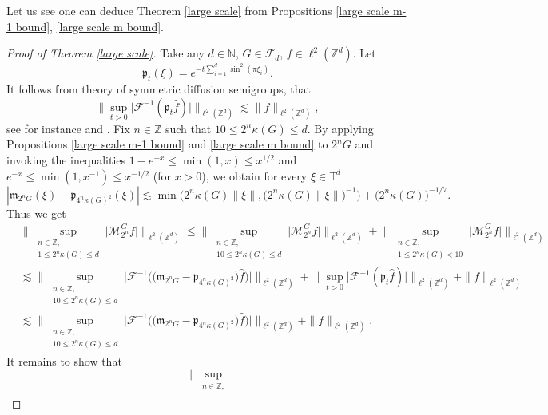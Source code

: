 \documentclass[a4paper,oneside, reqno]{amsart}
\numberwithin{equation}{section}
\theoremstyle{definition}%
\theoremstyle{definition}
\theoremstyle{definition}%
\theoremstyle{definition}
\newcommand{\Z}{\mathbb{Z}}
\newcommand{\N}{\mathbb{N}}
\newcommand{\T}{\mathbb{T}}
\begin{document}
Let us see one can deduce Theorem \ref{large scale} from Propositions \ref{large scale m-1 bound}, \ref{large scale m bound}.
\begin{proof}[Proof of Theorem \ref{large scale}]
Take any $d \in \N$, $G \in \mathcal{F}_d$, $f \in \ell^2(\Z^d)$. Let
\[
\mathfrak{p}_t(\xi)= e^{-t \sum_{i=1}^d \sin^2(\pi \xi_i)}.
\]
It follows from theory of symmetric diffusion semigroups, that
\[
\Big\|\sup_{t>0} \big| \mathcal{F}^{-1}(\mathfrak{p}_t \widehat{f}) \big| \Big\|_{\ell^2(\Z^d)} \lesssim \|f \|_{\ell^2(\Z^d)},
\]
see for instance \cite[p. 73]{Ste1} and \cite[Theorem 2.11]{NW}.
Fix $n \in \Z$ such that $10 \le 2^n \kappa(G) \le d$. By applying Propositions \ref{large scale m-1 bound} and \ref{large scale m bound} to $2^n G$ and invoking the inequalities $1 - e^{-x} \le \min(1, x) \le x^{1/2}$ and $e^{-x} \le \min(1,x^{-1}) \le x^{-1/2}$ (for $x > 0$), we obtain for every $\xi \in \T^d$
\[
|\mathfrak{m}_{2^nG}(\xi)-\mathfrak{p}_{4^n \kappa(G)^2}(\xi)| \lesssim \min \Big( 2^n \kappa(G) \|\xi \|, \big(2^n \kappa(G) \| \xi \|\big)^{-1} \Big)+ \Big(2^n\kappa(G) \Big)^{-1/7}.
\]
Thus we get
\begin{align*}
    &\Big\| \sup_{\substack{n \in \Z, \\
    1 \le 2^n \kappa(G) \le d}}\big| \mathcal{M}_{2^n}^G f\big| \Big\|_{\ell^2(\Z^d)} \le 
    \Big\| \sup_{\substack{n \in \Z, \\
    10 \le 2^n \kappa(G) \le d}} \big|\mathcal{M}_{2^n}^G f \big|\Big\|_{\ell^2(\Z^d)} +
    \Big\| \sup_{\substack{n \in \Z, \\
    1 \le 2^n \kappa(G) <10}} \big|\mathcal{M}_{2^n}^G f \big|\Big\|_{\ell^2(\Z^d)} \\
    &\lesssim  \bigg\| \sup_{\substack{n \in \Z, \\
    10 \le 2^n \kappa(G) \le d}} \Big|\mathcal{F}^{-1}\Big(\big(\mathfrak{m}_{2^nG}-\mathfrak{p}_{4^n \kappa(G)^2} \big)\widehat{f} \Big) \Big|\bigg\|_{\ell^2(\Z^d)} +\Big\|\sup_{t>0} \big| \mathcal{F}^{-1}(\mathfrak{p}_t \widehat{f}) \big| \Big\|_{\ell^2(\Z^d)}+ \|f \|_{\ell^2(\Z^d)} \\
    &\lesssim
    \bigg\| \sup_{\substack{n \in \Z, \\
    10 \le 2^n \kappa(G) \le d}} \Big|\mathcal{F}^{-1}\Big(\big(\mathfrak{m}_{2^nG}-\mathfrak{p}_{4^n \kappa(G)^2}\big) \widehat{f} \Big) \Big|\bigg\|_{\ell^2(\Z^d)} + \|f \|_{\ell^2(\Z^d)}.
\end{align*}
It remains to show that 
\begin{equation*}
     \bigg\| \sup_{\substack{n \in \Z, \\
}}
\end{equation*}
\end{proof}
\end{document}
